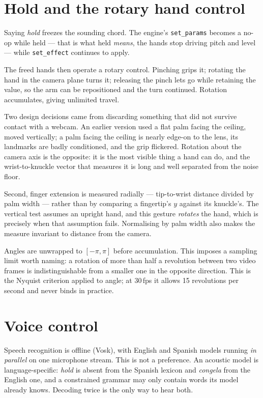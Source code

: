 \documentclass[a4paper,10pt,twocolumn]{article}
\newcommand{\code}[1]{\texttt{\small #1}}
\begin{document}
\section{Hold and the rotary hand control}
\label{sec:hold}

Saying \emph{hold} freezes the sounding chord. The engine's \code{set\_params}
becomes a no-op while held --- that is what held \emph{means}, the hands stop
driving pitch and level --- while \code{set\_effect} continues to apply.

The freed hands then operate a rotary control. Pinching grips it; rotating the
hand in the camera plane turns it; releasing the pinch lets go while retaining
the value, so the arm can be repositioned and the turn continued. Rotation
accumulates, giving unlimited travel.

Two design decisions came from discarding something that did not survive
contact with a webcam. An earlier version used a flat palm facing the ceiling,
moved vertically; a palm facing the ceiling is nearly edge-on to the lens, its
landmarks are badly conditioned, and the grip flickered. Rotation about the
camera axis is the opposite: it is the most visible thing a hand can do, and
the wrist-to-knuckle vector that measures it is long and well separated from
the noise floor.

Second, finger extension is measured radially --- tip-to-wrist distance divided
by palm width --- rather than by comparing a fingertip's $y$ against its
knuckle's. The vertical test assumes an upright hand, and this gesture
\emph{rotates} the hand, which is precisely when that assumption fails.
Normalising by palm width also makes the measure invariant to distance from the
camera.

Angles are unwrapped to $[-\pi,\pi]$ before accumulation. This imposes a
sampling limit worth naming: a rotation of more than half a revolution between
two video frames is indistinguishable from a smaller one in the opposite
direction. This is the Nyquist criterion applied to angle; at 30\,fps it allows
15 revolutions per second and never binds in practice.

\section{Voice control}
\label{sec:voice}

Speech recognition is offline (Vosk), with English and Spanish models running
\emph{in parallel} on one microphone stream. This is not a preference. An
acoustic model is language-specific: \emph{hold} is absent from the Spanish
lexicon and \emph{congela} from the English one, and a constrained grammar may
only contain words its model already knows. Decoding twice is the only way to
hear both.
\end{document}

